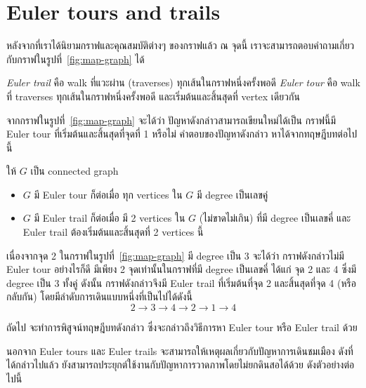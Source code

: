 \section{Euler tours and trails}

หลังจากที่เราได้นิยามกราฟและคุณสมบัติต่างๆ ของกราฟแล้ว ณ จุดนี้ เราจะสามารถตอบคำถามเกี่ยวกับกราฟในรูปที่~\ref{fig:map-graph} ได้

\begin{definition}
\emph{Euler trail} คือ walk ที่แวะผ่าน (traverses) ทุกเส้นในกราฟหนึ่งครั้งพอดี \enskip \emph{Euler tour} คือ walk ที่ traverses ทุกเส้นในกราฟหนึ่งครั้งพอดี และเริ่มต้นและสิ้นสุดที่ vertex เดียวกัน
\end{definition}
%
จากกราฟในรูปที่~\ref{fig:map-graph} จะได้ว่า ปัญหาดังกล่าวสามารถเขียนใหม่ได้เป็น กราฟนี้มี Euler tour ที่เริ่มต้นและสิ้นสุดที่จุดที่ 1 หรือไม่ \enskip คำตอบของปัญหาดังกล่าว หาได้จากทฤษฎีบทต่อไปนี้

\begin{theorem}
\label{thm:euler-tour-degree}
ให้ $G$ เป็น connected graph
\begin{itemize}
    \item $G$ มี Euler tour ก็ต่อเมื่อ ทุก vertices ใน $G$ มี degree เป็นเลขคู่
    \item $G$ มี Euler trail ก็ต่อเมื่อ มี 2 vertices ใน $G$ (ไม่ขาดไม่เกิน) ที่มี degree เป็นเลขคี่ และ Euler trail ต้องเริ่มต้นและสิ้นสุดที่ 2 vertices นี้
\end{itemize}
\end{theorem}
%
\begin{example}
เนื่องจากจุด 2 ในกราฟในรูปที่~\ref{fig:map-graph} มี degree เป็น 3 จะได้ว่า กราฟดังกล่าวไม่มี Euler tour \enskip อย่างไรก็ดี มีเพียง 2 จุดเท่านั้นในกราฟที่มี degree เป็นเลขคี่ ได้แก่ จุด 2 และ 4 ซึ่งมี degree เป็น 3 ทั้งคู่ \enskip ดังนั้น กราฟดังกล่าวจึงมี Euler trail ที่เริ่มต้นที่จุด 2 และสิ้นสุดที่จุด 4 (หรือกลับกัน) โดยมีลำดับการเดินแบบหนึ่งที่เป็นไปได้ดังนี้
\[2 → 3 → 4 → 2 → 1 → 4\]
\end{example}

ถัดไป จะทำการพิสูจน์ทฤษฎีบทดังกล่าว ซึ่งจะกล่าวถึงวิธีการหา Euler tour หรือ Euler trail ด้วย
%
\begin{pf}
\end{pf}

นอกจาก Euler tours และ Euler trails จะสามารถให้เหตุผลเกี่ยวกับปัญหาการเดินชมเมือง ดังที่ได้กล่าวไปแล้ว ยังสามารถประยุกต์ใช้งานกับปัญหาการวาดภาพโดยไม่ยกดินสอได้ด้วย ดังตัวอย่างต่อไปนี้

